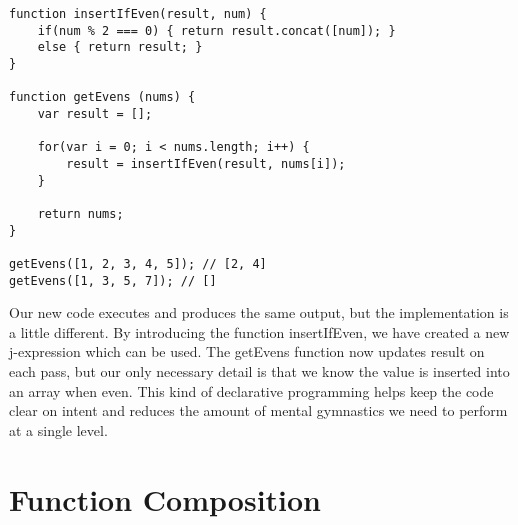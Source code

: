 \documentclass[a4paper,12pt,twoside]{book}
\begin{document}
\begin{lstlisting}
function insertIfEven(result, num) {
    if(num % 2 === 0) { return result.concat([num]); }
    else { return result; }
}

function getEvens (nums) {
    var result = [];
    
    for(var i = 0; i < nums.length; i++) {
        result = insertIfEven(result, nums[i]);    
    }
    
    return nums;
}

getEvens([1, 2, 3, 4, 5]); // [2, 4]
getEvens([1, 3, 5, 7]); // []
\end{lstlisting}

 Our new code executes and produces the same output, but the implementation is a little different. By introducing the function insertIfEven, we have created a new j-expression which can be used. The getEvens function now updates result on each pass, but our only necessary detail is that we know the value is inserted into an array when even. This kind of declarative programming helps keep the code clear on intent and reduces the amount of mental gymnastics we need to perform at a single level.

\section{Function Composition}
\end{document}

